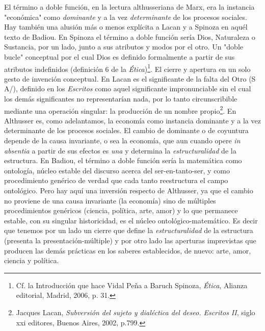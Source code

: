 \documentclass{book}
\begin{document}
El término a doble función, en la lectura althusseriana de Marx, era la
instancia "económica" como \emph{dominante} y a la vez
\emph{determinante} de los procesos sociales. Hay también una alusión
más o menos explícita a Lacan y a Spinoza en aquél texto de Badiou. En
Spinoza el término a doble función sería Dios, Naturaleza o Sustancia,
por un lado, junto a sus atributos y modos por el otro. Un "doble bucle"
conceptual por el cual Dios es definido formalmente a partir de sus
atributos indefinidos (definición 6 de la \emph{Ética})\footnote{Cf. la
  Introducción que hace Vidal Peña a Baruch Spinoza, \emph{Ética},
  Alianza editorial, Madrid, 2006, p. 31.}. El cierre y apertura en un
solo gesto de invención conceptual. En Lacan es el significante de la
falta del Otro (S A/), definido en los \emph{Escritos} como aquel
significante impronunciable sin el cual los demás significantes no
representarían nada, por lo tanto circunscribible mediante una operación
singular: la producción de un nombre propio\footnote{Jacques Lacan,
  \emph{Subversión del sujeto y dialéctica del deseo. Escritos II},
  siglo xxi editores, Buenos Aires, 2002, p.799.}. En Althusser es, como
adelantamos, la economía como instancia dominante y a la vez
determinante de los procesos sociales. El cambio de dominante o de
coyuntura depende de la causa invariante, o sea la economía, que aun
cuando opere \emph{in absentia} a partir de sus efectos es \emph{una} y
determina la \emph{estructuralidad} de la estructura. En Badiou, el
término a doble función sería la matemática como ontología, núcleo
estable del discurso acerca del ser-en-tanto-ser, y como procedimiento
genérico de verdad que cada tanto reestructura el campo ontológico. Pero
hay aquí una inversión respecto de Althusser, ya que el cambio no
proviene de una causa invariante (la economía) sino de múltiples
procedimientos genéricos (ciencia, política, arte, amor) y lo que
permanece estable, con su singular historicidad, es el núcleo
ontológico-matemático. Es decir que tenemos por un lado un cierre que
define la \emph{estructuralidad} de la estructura (presenta la
presentación-múltiple) y por otro lado las aperturas imprevistas que
producen las demás prácticas en los saberes establecidos, de nuevo:
arte, amor, ciencia y política.
\end{document}
